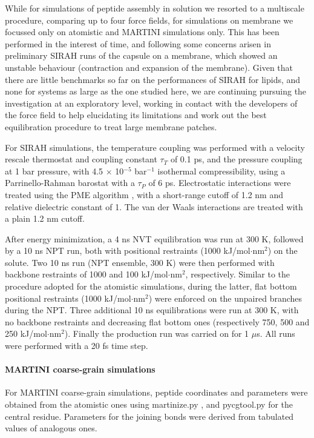 While for simulations of peptide assembly in solution we resorted to a multiscale procedure, comparing up to four force fields, for simulations on membrane we focussed only on atomistic and MARTINI simulations only. This has been performed in the interest of time, and following some concerns arisen in preliminary SIRAH runs of the capsule on a membrane, which showed an unstable behaviour (contraction and expansion of the membrane).
%
Given that there are little benchmarks so far on the performances of SIRAH for lipids, and none for systems as large as the one studied here, we are continuing pursuing the investigation at an exploratory level, working in contact with the developers of the force field to help elucidating its limitations and work out the best equilibration procedure to treat large membrane patches.

For SIRAH simulations, the temperature coupling was performed with a velocity rescale thermostat \cite{Bussi2007} and coupling constant $\tau _T$ of 0.1 ps, and the pressure coupling at 1 bar pressure, with 4.5 $\times$ 10$^{-5}$ bar$^{-1}$ isothermal compressibility, using a Parrinello-Rahman barostat \cite{Parrinello1981} with a $\tau _P$ of 6 ps. Electrostatic interactions were treated using the PME algorithm \cite{Essmann1995}, with a short-range cutoff of 1.2 nm and relative dielectric constant of 1. The van der Waals interactions are treated with a plain 1.2 nm cutoff.

After energy minimization, a 4 ns NVT equilibration was run at 300 K, followed by a 10 ns NPT run, both with positional restraints (1000 kJ/mol$\cdot$nm$^2$) on the solute. Two 10 ns run (NPT ensemble, 300 K) were then performed with backbone restraints of 1000 and 100 kJ/mol$\cdot$nm$^2$, respectively. Similar to the procedure adopted for the atomistic simulations, during the latter, flat bottom positional restraints (1000 kJ/mol$\cdot$nm$^2$) were enforced on the unpaired branches during the NPT. Three additional 10 ns equilibrations were run at 300 K, with no backbone restraints and decreasing flat bottom ones (respectively 750, 500 and 250 kJ/mol$\cdot$nm$^2$). Finally the production run was carried on for 1 $\mu$s. All runs were performed with a 20 fs time step.

\paragraph{MARTINI coarse-grain simulations}
For MARTINI \cite{Marrink2007, Monticelli2008} coarse-grain simulations, peptide coordinates and parameters were obtained from the atomistic ones using martinize.py \cite{DeJong2013}, and pycgtool.py \cite{Graham2017} for the central residue. Parameters for the joining bonds were derived from tabulated values of analogous ones.


